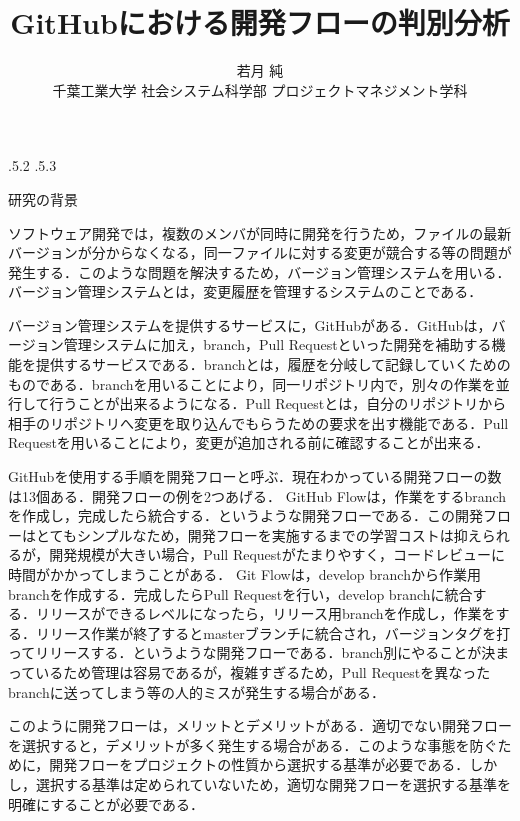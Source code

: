 \documentclass[uplatex,twocolumn]{jsarticle}
\title{\vspace{-14mm}GitHubにおける開発フローの判別分析 \footnotemark[0]}
\author{若月 純 \footnotemark[1] \\ 千葉工業大学 社会システム科学部 プロジェクトマネジメント学科\footnotemark[2]}
\date{}%
\makeatletter
\renewcommand{\section}{%
    \if@slide\clearpage\fi
    \@startsection{section}{1}{\z@}%
    {\Cvs \@plus.5\Cdp \@minus.2\Cdp}%
    {.5\Cvs \@plus.3\Cdp}%
    {\normalfont\raggedright}}
\makeatother
\begin{document}
\twocolumn[
	\maketitle
]
\begingroup
\def\thefootnote{\fnsymbol{footnote}}
\endgroup

\section{研究の背景}

ソフトウェア開発では，複数のメンバが同時に開発を行うため，ファイルの最新バージョンが分からなくなる，同一ファイルに対する変更が競合する等の問題が発生する．このような問題を解決するため，バージョン管理システムを用いる．バージョン管理システムとは，変更履歴を管理するシステムのことである\cite{ikeda2014}．

バージョン管理システムを提供するサービスに，GitHubがある．GitHubは，バージョン管理システムに加え，branch，Pull Requestといった開発を補助する機能を提供するサービスである．branchとは，履歴を分岐して記録していくためのものである．branchを用いることにより，同一リポジトリ内で，別々の作業を並行して行うことが出来るようになる．Pull Requestとは，自分のリポジトリから相手のリポジトリへ変更を取り込んでもらうための要求を出す機能である．Pull Requestを用いることにより，変更が追加される前に確認することが出来る．

GitHubを使用する手順を開発フローと呼ぶ．現在わかっている開発フローの数は13個ある．開発フローの例を2つあげる．
GitHub Flowは，作業をするbranchを作成し，完成したら統合する．というような開発フローである．この開発フローはとてもシンプルなため，開発フローを実施するまでの学習コストは抑えられるが，開発規模が大きい場合，Pull Requestがたまりやすく，コードレビューに時間がかかってしまうことがある．
Git Flowは，develop branchから作業用branchを作成する．完成したらPull Requestを行い，develop branchに統合する．リリースができるレベルになったら，リリース用branchを作成し，作業をする．リリース作業が終了するとmasterブランチに統合され，バージョンタグを打ってリリースする．というような開発フローである．branch別にやることが決まっているため管理は容易であるが，複雑すぎるため，Pull Requestを異なったbranchに送ってしまう等の人的ミスが発生する場合がある\cite{otsuka2014}．

このように開発フローは，メリットとデメリットがある．適切でない開発フローを選択すると，デメリットが多く発生する場合がある．このような事態を防ぐために，開発フローをプロジェクトの性質から選択する基準が必要である．しかし，選択する基準は定められていないため，適切な開発フローを選択する基準を明確にすることが必要である．
\end{document}
